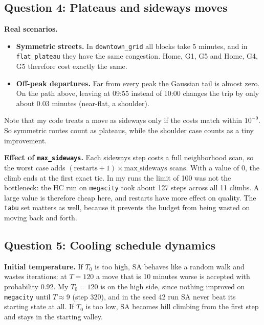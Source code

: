 \documentclass[11pt,a4paper]{article}
\newcommand{\col}[1]{\texttt{#1}}
\begin{document}
\subsection*{Question 4: Plateaus and sideways moves}

\textbf{Real scenarios.}
\begin{itemize}
  \item \textbf{Symmetric streets.} In \col{downtown\_grid} all blocks take 5 minutes, and in
  \col{flat\_plateau} they have the same congestion. Home, G1, G5 and Home, G4, G5 therefore cost
  exactly the same.
  \item \textbf{Off-peak departures.} Far from every peak the Gaussian tail is almost zero. On the
  path above, leaving at 09:55 instead of 10:00 changes the trip by only about 0.03 minutes
  (near-flat, a shoulder).
\end{itemize}
Note that my code treats a move as sideways only if the costs match within $10^{-9}$. So symmetric
routes count as plateaus, while the shoulder case counts as a tiny improvement.

\textbf{Effect of \col{max\_sideways}.} Each sideways step costs a full neighborhood scan, so the worst
case adds $(\text{restarts} + 1) \times \text{max\_sideways}$ scans. With a value of 0, the climb ends at the
first exact tie. In my runs the limit of 100 was not the bottleneck: the HC run on \col{megacity} took
about 127 steps across all 11 climbs. A large value is therefore cheap here, and restarts have
more effect on quality. The \col{tabu} set matters as well, because it prevents the budget from being
wasted on moving back and forth.

\subsection*{Question 5: Cooling schedule dynamics}

\textbf{Initial temperature.} If $T_0$ is too high, SA behaves like a random walk and wastes
iterations: at $T = 120$ a move that is 10 minutes worse is accepted with probability $0.92$. My
$T_0 = 120$ is on the high side, since nothing improved on \col{megacity} until $T \approx 9$ (step 320),
and in the seed 42 run SA never beat its starting state at all.
If $T_0$ is too low, SA becomes hill climbing from the first step and stays in the starting valley.
\end{document}
